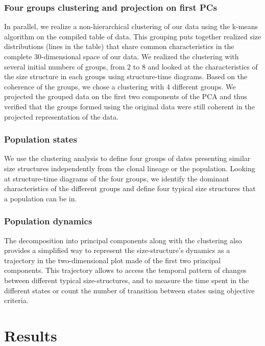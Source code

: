 \subsubsection{Four groups clustering and projection on first PCs}

In parallel, we realize a non-hierarchical clustering of our data using the
k-means algorithm on the compiled table of data. This grouping puts together
realized size distributions (lines in the table) that share common
characteristics in the complete 30-dimensional space of our data. We realized
the clustering with several initial numbers of groups, from 2 to 8 and looked at
the characteristics of the size structure in each groups using structure-time
diagrams. Based on the coherence of the groups, we chose a clustering with 4
different groups. We projected the grouped data on the first two components of
the PCA and thus verified that the groups formed using the original data were
still coherent in the projected representation of the data.

\subsubsection{Population states}

We use the clustering analysis to define four groups of dates presenting similar
size structures independently from the clonal lineage or the population. Looking
at structure-time diagrams of the four groups, we identify the dominant
characteristics of the different groups and define four typical size structures
that a population can be in.

\subsubsection{Population dynamics}

The decomposition into principal components along with the clustering also
provides a simplified way to represent the size-structure’s dynamics as a
trajectory in the two-dimensional plot made of the first two principal
components. This trajectory allows to access the temporal pattern of changes
between different typical size-structures, and to measure the time spent in the
different states or count the number of transition between states using
objective criteria.

\section{Results}

